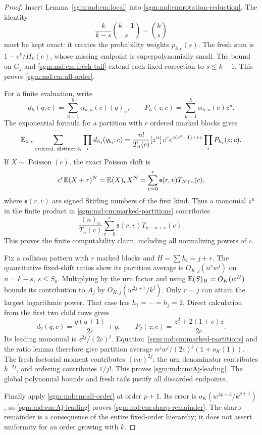 \documentclass[11pt,letterpaper]{article}
\theoremstyle{remark}\newtheorem{remark}[theorem]{Remark}
\newcommand{\Poi}{\operatorname{Poisson}}\newcommand{\Bin}{\operatorname{Bin}}
\newcommand{\fall}[2]{(#1)_{#2}}\newcommand{\rise}[2]{#1^{\overline{#2}}}
\theoremstyle{definition}\newtheorem{definition}[theorem]{Definition}
\begin{document}
\begin{proof}
Insert Lemma~\ref{sgm:md:cm:local} into
\eqref{sgm:md:cm:rotation-reduction}. The identity
\[
 \frac{k}{k-s}\binom{k-1}{s}=\binom ks
\]
must be kept exact: it creates the probability weights
\(p_{k,c}(s)\). The fresh sum is
\(1-c^k/H_k(c)\), whose missing endpoint is superpolynomially
small. The bound on \(G_j\) and \eqref{sgm:md:cm:fresh-tail} extend
each fixed correction to \(s\le k-1\). This proves
\eqref{sgm:md:cm:all-order}.

For a finite evaluation, write
\[
 d_h(q;c)=\sum_{u=1}^h\alpha_{h,u}(c)\fall{q}{u},\qquad
 P_h(z;c)=\sum_{u=1}^h\alpha_{h,u}(c)z^u.
\]
The exponential formula for a partition with \(r\) ordered
marked blocks gives
\begin{equation}\label{sgm:md:cm:marked-partitions}
 \mathbb E_{\pi,c}\sum_{\text{ordered, distinct }b_i}\prod_i d_{h_i}(q_{b_i};c)
 =\frac{n!}{T_n(c)}[z^n]\,
 c^r e^{c(e^z-1)+rz}\prod_iP_{h_i}(z;c).
\end{equation}
If \(X\sim\Poi(c)\), the exact Poisson shift is
\[
 c^r\E(X+r)^N=\E\fall{X}{r}X^N
       =\sum_{v=0}^r\mathfrak s(r,v)T_{N+v}(c),
\]
where \(\mathfrak s(r,v)\) are signed Stirling numbers of the
first kind. Thus a monomial \(z^u\) in the finite product in
\eqref{sgm:md:cm:marked-partitions} contributes
\[
 \frac{\fall{n}{u}}{T_n(c)}
        \sum_{v=0}^r\mathfrak s(r,v)T_{n-u+v}(c).
\]
This proves the finite computability claim, including all
normalizing powers of \(c\).

Fix a collision pattern with \(r\) marked blocks and
\(H=\sum h_i=j+r\). The quantitative fixed-shift ratios
show its partition average is \(O_{K,j}(n^rw^j)\) on
\(n=k-s\), \(s\le S_0\). Multiplying by the urn factor
and using \(\E\fall{S}{H}=O_K(w^H)\) bounds its contribution
to \(A_j\) by \(O_{K,j}(w^{2j+r}/k^j)\).
Only \(r=j\) can attain the largest logarithmic power.
That case has \(h_1=\cdots=h_j=2\).
Direct calculation from the first two child rows gives
\begin{equation}\label{sgm:md:cm:P2}
 d_2(q;c)=\frac{q(q+1)}{2c}+q,\qquad
 P_2(z;c)=\frac{z^2+2(1+c)z}{2c}.
\end{equation}
Its leading monomial is \(z^{2j}/(2c)^j\).
Equation~\eqref{sgm:md:cm:marked-partitions} and the ratio lemma
therefore give partition average
\(n^jw^j/(2c)^j(1+o_K(1))\).
The fresh factorial moment contributes \((cw)^{2j}\);
the urn denominator contributes \(k^{-2j}\), and ordering
contributes \(1/j!\). This proves \eqref{sgm:md:cm:Aj-leading}.
The global polynomial bounds and fresh tails justify all
discarded endpoints.

Finally apply \eqref{sgm:md:cm:all-order} at order \(p+1\).
Its error is \(o_K(w^{3p+3}/k^{p+1})\), so
\eqref{sgm:md:cm:Aj-leading} proves \eqref{sgm:md:cm:sharp-remainder}.
The sharp remainder is a consequence of the entire fixed-order
hierarchy; it does not assert uniformity for an order growing with \(k\).
\end{proof}
\end{document}

